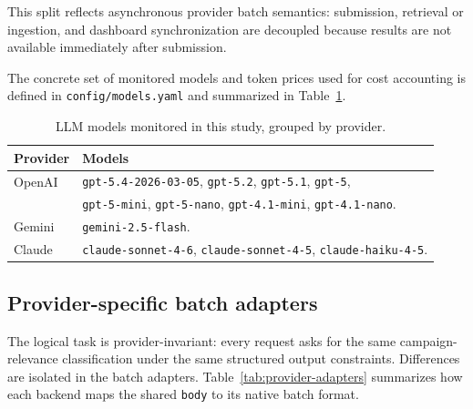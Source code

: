 This split reflects asynchronous provider batch semantics: submission, retrieval or ingestion, and dashboard synchronization are decoupled because results are not available immediately after submission.

The concrete set of monitored models and token prices used for cost accounting is defined in \texttt{config/models.yaml} and summarized in Table~\ref{tab:monitored-models}.

\begin{table}[htbp]
\centering
\caption{LLM models monitored in this study, grouped by provider.}
\label{tab:monitored-models}
\begin{tabular}{ll}
\toprule
\textbf{Provider} & \textbf{Models} \\
\midrule
OpenAI   & \texttt{gpt-5.4-2026-03-05}, \texttt{gpt-5.2}, \texttt{gpt-5.1}, \texttt{gpt-5}, \\
         & \texttt{gpt-5-mini}, \texttt{gpt-5-nano}, \texttt{gpt-4.1-mini}, \texttt{gpt-4.1-nano}. \\
Gemini   & \texttt{gemini-2.5-flash}. \\
Claude   & \texttt{claude-sonnet-4-6}, \texttt{claude-sonnet-4-5}, \texttt{claude-haiku-4-5}. \\
\bottomrule
\end{tabular}
\end{table}

\subsection{Provider-specific batch adapters}
\label{sec:provider-adapters}

The logical task is provider-invariant: every request asks for the same campaign-relevance classification under the same structured output constraints. Differences are isolated in the batch adapters. Table~\ref{tab:provider-adapters} summarizes how each backend maps the shared \texttt{body} to its native batch format.

